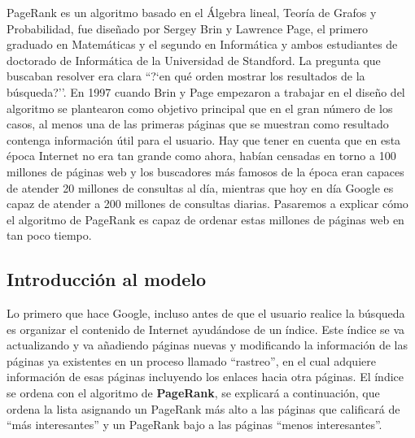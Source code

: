 \documentclass[size=a4, parskip=half, titlepage=false, toc=flat, toc=bib, 12pt, twoside]{scrartcl}
\theoremstyle{theorem-style}
\theoremstyle{definition-style}
\theoremstyle{remark-style}
\theoremstyle{example-style}
\theoremstyle{definition-style}
\theoremstyle{remark-style}
\begin{document}
PageRank es un algoritmo basado en el Álgebra lineal, Teoría de Grafos y Probabilidad, fue diseñado por Sergey Brin y Lawrence Page, el primero graduado en Matemáticas y el segundo en Informática y ambos estudiantes de doctorado de Informática de la Universidad de Standford. La pregunta que buscaban resolver era clara ``?`en qué orden mostrar los resultados de la búsqueda?''. En 1997 cuando Brin y Page empezaron a trabajar en el diseño del algoritmo se plantearon como objetivo principal que en el gran número de los casos, al menos una de las primeras páginas que se muestran como resultado contenga información útil para el usuario. Hay que tener en cuenta que en esta época Internet no era tan grande como ahora, habían censadas en torno a 100 millones de páginas web y los buscadores más famosos de la época eran capaces de atender 20 millones de consultas al día, mientras que hoy en día Google es capaz de atender a 200 millones de consultas diarias. Pasaremos a explicar cómo el algoritmo de PageRank es capaz de ordenar estas millones de páginas web en tan poco tiempo.

\subsection{Introducción al modelo}
Lo primero que hace Google, incluso antes de que el usuario realice la búsqueda es organizar el contenido de Internet ayudándose de un índice. Este índice se va actualizando y va añadiendo páginas nuevas y modificando la información de las páginas ya existentes en un proceso llamado ``rastreo'', en el cual adquiere información de esas páginas incluyendo los enlaces hacia otra páginas. El índice se ordena con el algoritmo de \textbf{PageRank}, se explicará a continuación, que ordena la lista asignando un PageRank más alto a las páginas que calificará de ``más interesantes'' y un PageRank bajo a las páginas ``menos interesantes''.
\end{document}
